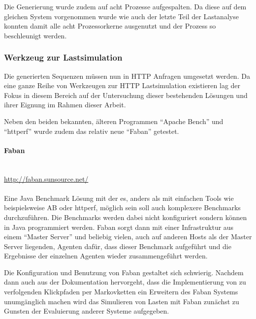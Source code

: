 \documentclass[10pt]{scrartcl}
\begin{document}
  Die Generierung wurde zudem auf acht Prozesse aufgespalten. Da diese auf dem gleichen System vorgenommen wurde wie auch der letzte Teil der Lastanalyse konnten damit alle acht Prozessorkerne ausgenutzt und der Prozess so beschleunigt werden.
  
  
  \subsubsection{Werkzeug zur Lastsimulation}
  Die generierten Sequenzen müssen nun in HTTP Anfragen umgesetzt werden. Da eine ganze Reihe von Werkzeugen zur HTTP Lastsimulation existieren lag der Fokus in diesem Bereich auf der Untersuchung dieser bestehenden Lösungen und ihrer Eignung im Rahmen dieser Arbeit.
  
  Neben den beiden bekannten, älteren Programmen ``Apache Bench'' und ``httperf'' wurde zudem das relativ neue ``Faban'' getestet. 
  
  
  \paragraph{Faban}  ~\\
  \url{http://faban.sunsource.net/}
  \\
  ~\\
  Eine Java Benchmark Lösung mit der es, anders als mit einfachen Tools wie
  beispielsweise AB oder httperf, möglich sein soll auch komplexere Benchmarks
  durchzuführen. Die Benchmarks werden dabei nicht konfiguriert sondern können
  in Java programmiert werden. Faban sorgt dann mit einer Infrastruktur aus 
  einem ``Master Server'' und beliebig vielen, auch auf anderen Hosts als der
  Master Server liegenden, Agenten dafür, dass dieser Benchmark aufgeführt und
  die Ergebnisse der einzelnen Agenten wieder zusammengeführt werden.
  
  Die Konfiguration und Benutzung von Faban gestaltet sich schwierig. Nachdem 
  dann auch aus der Dokumentation hervorgeht, dass die Implementierung von
  zu verfolgenden Klickpfaden per Markovketten ein Erweitern des Faban Systems
  unumgänglich machen wird das Simulieren von Lasten mit Faban zunächst zu 
  Gunsten der Evaluierung anderer Systeme aufgegeben.
  
\end{document}
